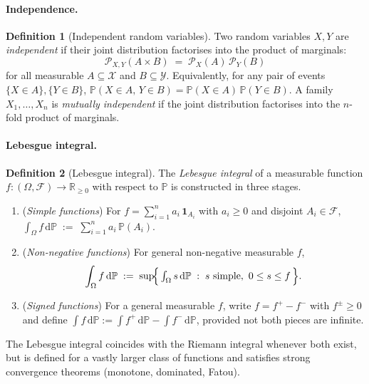 \documentclass[11pt]{article}
\theoremstyle{definition}
\newtheorem{definition}{Definition}
\begin{document}
\paragraph{Independence.}

\begin{definition}[Independent random variables]
Two random variables $X, Y$ are \emph{independent} if their joint
distribution factorises into the product of marginals:
\[
  \mathcal{P}_{X, Y}(A \times B) \;=\; \mathcal{P}_{X}(A)\,\mathcal{P}_{Y}(B)
\]
for all measurable $A \subseteq \mathcal{X}$ and $B \subseteq \mathcal{Y}$.
Equivalently, for any pair of events $\{X \in A\}, \{Y \in B\}$,
$\mathbb{P}(X \in A,\, Y \in B) = \mathbb{P}(X \in A)\,\mathbb{P}(Y \in B)$.
A family $X_{1}, \dots, X_{n}$ is \emph{mutually independent} if the joint
distribution factorises into the $n$-fold product of marginals.
\end{definition}

\paragraph{Lebesgue integral.}

\begin{definition}[Lebesgue integral]
The \emph{Lebesgue integral} of a measurable function
$f : (\Omega, \mathcal{F}) \to \mathbb{R}_{\geq 0}$ with respect to
$\mathbb{P}$ is constructed in three stages.
\begin{enumerate}[label=(\arabic*), leftmargin=2em]
  \item (\emph{Simple functions}) For
        $f = \sum_{i=1}^{n} a_{i}\, \mathbf{1}_{A_{i}}$ with
        $a_{i} \geq 0$ and disjoint $A_{i} \in \mathcal{F}$,
        $\displaystyle \int_{\Omega} f\, \mathrm{d}\mathbb{P}
         \;:=\; \sum_{i=1}^{n} a_{i}\, \mathbb{P}(A_{i}).$
  \item (\emph{Non-negative functions}) For general non-negative measurable
        $f$,
        \[
          \int_{\Omega} f\, \mathrm{d}\mathbb{P}
          \;:=\; \sup\!\Bigl\{\,
            \textstyle\int_{\Omega} s\, \mathrm{d}\mathbb{P}
            \;:\; s \text{ simple},\ 0 \leq s \leq f \,\Bigr\}.
        \]
  \item (\emph{Signed functions}) For a general measurable $f$, write
        $f = f^{+} - f^{-}$ with $f^{\pm} \geq 0$ and define
        $\int f\, \mathrm{d}\mathbb{P}
         := \int f^{+}\, \mathrm{d}\mathbb{P} - \int f^{-}\, \mathrm{d}\mathbb{P}$,
        provided not both pieces are infinite.
\end{enumerate}
The Lebesgue integral coincides with the Riemann integral whenever both
exist, but is defined for a vastly larger class of functions and satisfies
strong convergence theorems (monotone, dominated, Fatou).
\end{definition}
\end{document}
